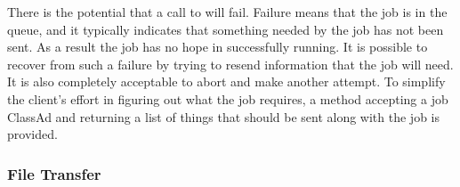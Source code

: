 

There is the
potential that a call to  will fail.
Failure means that the
job is in the queue,
and it typically indicates that
something needed by the job has not been sent.
As a result the job has no hope in successfully running.
It is possible to recover from
such a failure by trying to resend information that the job will
need. It is also completely acceptable to abort and make another
attempt. To simplify the client's effort in figuring out what the job
requires, a  method accepting a 
job ClassAd and
returning a list of things that should be sent along with the job is
provided.

\subsubsection{\label{WebService-File-Transfer} File Transfer}

